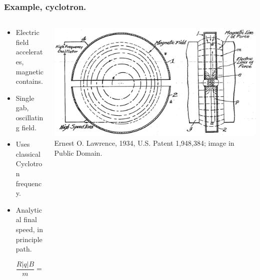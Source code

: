 \documentclass{beamer}
\begin{document}

\begin{frame}
\frametitle{Example, cyclotron.}
\begin{columns}
\begin{column}{0.5\linewidth}
\begin{itemize}
\item<1-> Electric field accelerates, magnetic contains.

\item<2-> Single gab, oscillating field.

\item<3-> Uses classical Cyclotron frequency.

\item<4-> Analytical final speed, in principle path.

\begin{equation*}
\frac{R|q|B}{m} = v_\perp.
\end{equation*}

\end{itemize}
\end{column}
\begin{column}{0.5\linewidth}
\includegraphics[width=\linewidth]{ Cyclotron_patent.png}
{\color{gray} Ernest O. Lawrence, 1934, U.S. Patent 1,948,384; image in Public Domain.}
\end{column}
\end{columns}
\end{frame}
\end{document}

